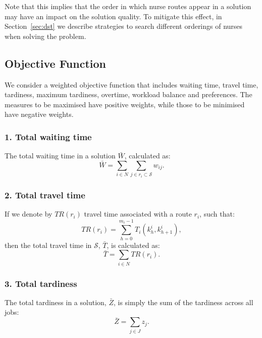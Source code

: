 \documentclass[a4paper,11pt,authoryear]{elsarticle}
\begin{document}
\noindent Note that this implies that the order in which nurse routes appear in a solution may have an impact on the solution quality. To mitigate this effect, in Section~\ref{sec:dst} we describe strategies to search different orderings of nurses when solving the problem.

\subsection{Objective Function}
\label{sub:objectivefunc}
\noindent We consider a weighted objective function that includes waiting time, travel time, tardiness, maximum tardiness, overtime, workload balance and preferences. The measures to be maximised have positive weights, while those to be minimised have negative weights.

\subsubsection*{1. Total waiting time}
\noindent The total waiting time in a solution $\bar{W}$, calculated as:
\begin{equation}
     \bar{W} = \sum_{i \in N} \sum_{j \in r_i \subset \mathcal{S}} w_{ij}.
\end{equation}

\subsubsection*{2. Total travel time}
\noindent If we denote by $TR(r_i)$ travel time associated with a route $r_i$, such that:
\begin{equation}
    TR(r_i) =  \sum_{h = 0}^{m_i - 1} T_i(k^i_h, k^i_{h + 1}),
\end{equation}
then the total travel time in $\mathcal{S}$, $\bar{T}$, is calculated as:
\begin{equation}
     \bar{T} = \sum_{i \in N}  TR(r_i).
\end{equation}

\subsubsection*{3. Total tardiness}
\noindent The total tardiness in a solution, $\bar{Z}$, is simply the sum of the tardiness across all jobs:
\begin{equation}
    \bar{Z} = \sum_{j \in J} z_j.
\end{equation}
\end{document}
